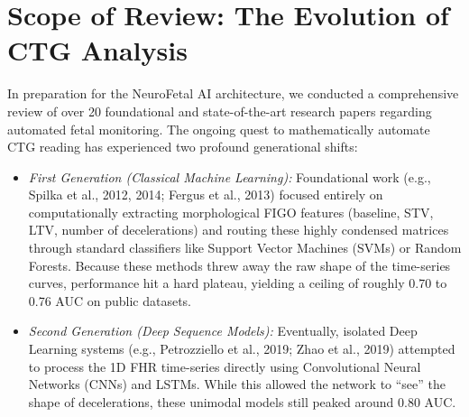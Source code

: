 \documentclass[12pt,a4paper]{report}
\begin{document}
\section{Scope of Review: The Evolution of CTG Analysis}
In preparation for the NeuroFetal AI architecture, we conducted a comprehensive review of over 20 foundational and state-of-the-art research papers regarding automated fetal monitoring. The ongoing quest to mathematically automate CTG reading has experienced two profound generational shifts:
\begin{itemize}
    \item \textit{First Generation (Classical Machine Learning):} Foundational work (e.g., Spilka et al., 2012, 2014; Fergus et al., 2013) focused entirely on computationally extracting morphological FIGO features (baseline, STV, LTV, number of decelerations) and routing these highly condensed matrices through standard classifiers like Support Vector Machines (SVMs) or Random Forests. Because these methods threw away the raw shape of the time-series curves, performance hit a hard plateau, yielding a ceiling of roughly 0.70 to 0.76 AUC on public datasets.
    \item \textit{Second Generation (Deep Sequence Models):} Eventually, isolated Deep Learning systems (e.g., Petrozziello et al., 2019; Zhao et al., 2019) attempted to process the 1D FHR time-series directly using Convolutional Neural Networks (CNNs) and LSTMs. While this allowed the network to ``see'' the shape of decelerations, these unimodal models still peaked around 0.80 AUC.
\end{itemize}
\end{document}
